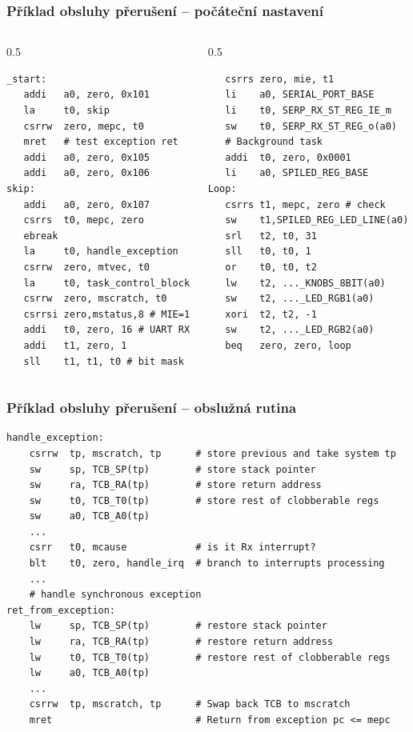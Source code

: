 \documentclass{beamer}
\begin{document}
\begin{frame}[fragile]
\frametitle{Příklad obsluhy přerušení -- počáteční nastavení}

\begin{columns}
\begin{column}{0.5\textwidth}
\begin{verbatim}
_start:
   addi   a0, zero, 0x101
   la     t0, skip
   csrrw  zero, mepc, t0
   mret   # test exception ret
   addi   a0, zero, 0x105
   addi   a0, zero, 0x106
skip:
   addi   a0, zero, 0x107
   csrrs  t0, mepc, zero
   ebreak
   la     t0, handle_exception
   csrrw  zero, mtvec, t0
   la     t0, task_control_block
   csrrw  zero, mscratch, t0
   csrrsi zero,mstatus,8 # MIE=1
   addi   t0, zero, 16 # UART RX
   addi   t1, zero, 1
   sll    t1, t1, t0 # bit mask
\end{verbatim}
\end{column}
\begin{column}{0.5\textwidth}
\begin{verbatim}
   csrrs zero, mie, t1
   li    a0, SERIAL_PORT_BASE
   li    t0, SERP_RX_ST_REG_IE_m
   sw    t0, SERP_RX_ST_REG_o(a0)
   # Background task
   addi  t0, zero, 0x0001
   li    a0, SPILED_REG_BASE
Loop:
   csrrs t1, mepc, zero # check
   sw    t1,SPILED_REG_LED_LINE(a0)
   srl   t2, t0, 31
   sll   t0, t0, 1
   or    t0, t0, t2
   lw    t2, ..._KNOBS_8BIT(a0)
   sw    t2, ..._LED_RGB1(a0)
   xori  t2, t2, -1
   sw    t2, ..._LED_RGB2(a0)
   beq   zero, zero, loop
\end{verbatim}
\end{column}
\end{columns}

\end{frame}

\begin{frame}[fragile]
\frametitle{Příklad obsluhy přerušení -- obslužná rutina}

\begin{verbatim}
handle_exception:
    csrrw  tp, mscratch, tp      # store previous and take system tp
    sw     sp, TCB_SP(tp)        # store stack pointer
    sw     ra, TCB_RA(tp)        # store return address
    sw     t0, TCB_T0(tp)        # store rest of clobberable regs
    sw     a0, TCB_A0(tp)
    ...
    csrr   t0, mcause            # is it Rx interrupt?
    blt    t0, zero, handle_irq  # branch to interrupts processing
    ...
    # handle synchronous exception
ret_from_exception:
    lw     sp, TCB_SP(tp)        # restore stack pointer
    lw     ra, TCB_RA(tp)        # restore return address
    lw     t0, TCB_T0(tp)        # restore rest of clobberable regs
    lw     a0, TCB_A0(tp)
    ...
    csrrw  tp, mscratch, tp      # Swap back TCB to mscratch
    mret                         # Return from exception pc <= mepc
\end{verbatim}
\end{frame}
\end{document}
